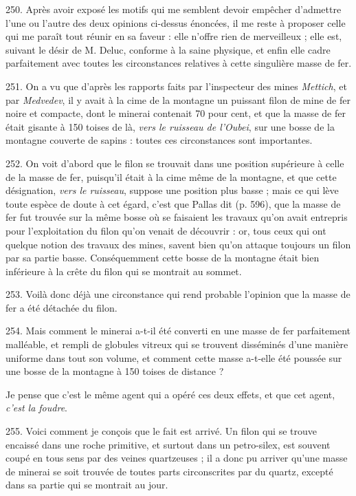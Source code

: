 \documentclass[a4paper, 11pt, oneside, polutonikogreek, french]{article}
\begin{document}
250. Après avoir exposé les motifs qui me semblent devoir empêcher d'admettre l'une ou l'autre des deux opinions ci-dessus énoncées, il me reste à proposer celle qui me paraît tout réunir en sa faveur : elle n'offre rien de merveilleux ; elle est, suivant le désir de M. Deluc, conforme à la saine physique, et enfin elle cadre parfaitement avec toutes les circonstances relatives à cette singulière masse de fer.

251. On a vu que d'après les rapports faits par l'inspecteur des mines \emph{Mettich}, et par \emph{Medvedev}, il y avait à la cime de la montagne un puissant filon de mine de fer noire et compacte, dont le minerai contenait 70 pour cent, et que la masse de fer était gisante à 150 toises de là, \emph{vers le ruisseau de l'Oubei}, sur une bosse de la montagne couverte de sapins : toutes ces circonstances sont importantes.

252. On voit d'abord que le filon se trouvait dans une position supérieure à celle de la masse de fer, puisqu'il était à la cime même de la montagne, et que cette désignation, \emph{vers le ruisseau}, suppose une position plus basse ; mais ce qui lève toute espèce de doute à cet égard, c'est que Pallas dit (p. 596), que la masse de fer fut trouvée sur la même bosse où se faisaient les travaux qu'on avait entrepris pour l'exploitation du filon qu'on venait de découvrir : or, tous ceux qui ont quelque notion des travaux des mines, savent bien qu'on attaque toujours un filon par sa partie basse. Conséquemment cette bosse de la montagne était bien inférieure à la crête du filon qui se montrait au sommet.

253. Voilà donc déjà une circonstance qui rend probable l'opinion que la masse de fer a été détachée du filon.

254. Mais comment le minerai a-t-il été converti en une masse de fer parfaitement malléable, et rempli de globules vitreux qui se trouvent disséminés d'une manière uniforme dans tout son volume, et comment cette masse a-t-elle été poussée sur une bosse de la montagne à 150 toises de distance ?

Je pense que c'est le même agent qui a opéré ces deux effets, et que cet agent, \emph{c'est la foudre}.

255. Voici comment je conçois que le fait est arrivé. Un filon qui se trouve encaissé dans une roche primitive, et surtout dans un petro-silex, est souvent coupé en tous sens par des veines quartzeuses ; il a donc pu arriver qu'une masse de minerai se soit trouvée de toutes parts circonscrites par du quartz, excepté dans sa partie qui se montrait au jour.
\end{document}
